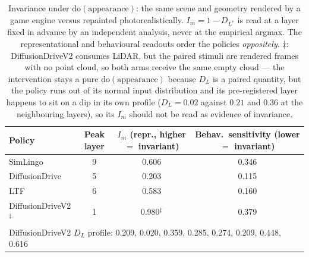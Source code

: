 \begin{table}[!tb]
\centering
\setlength{\tabcolsep}{4pt}
\footnotesize
\caption{Invariance under $\mathrm{do}(\text{appearance})$: the same scene and geometry rendered by a game engine versus repainted photorealistically. $I_m=1-D_{L^\ast}$ is read at a layer fixed in advance by an independent analysis, never at the empirical argmax. The representational and behavioural readouts order the policies \emph{oppositely}. $\ddagger$: DiffusionDriveV2 consumes LiDAR, but the paired stimuli are rendered frames with no point cloud, so both arms receive the same empty cloud --- the intervention stays a pure $\mathrm{do}(\text{appearance})$ because $D_L$ is a paired quantity, but the policy runs out of its normal input distribution and its pre-registered layer happens to sit on a dip in its own profile ($D_L=0.02$ against $0.21$ and $0.36$ at the neighbouring layers), so its $I_m$ should not be read as evidence of invariance.}
\label{tab:iaxis}
\begin{tabular}{lccc}
\toprule
Policy & Peak layer & $I_m$ (repr., higher $=$ invariant) & Behav.\ sensitivity (lower $=$ invariant)\\
\midrule
SimLingo & 9 & 0.606 & 0.346\\
DiffusionDrive & 5 & 0.203 & 0.115\\
LTF & 6 & 0.583 & 0.160\\
DiffusionDriveV2$^\ddagger$ & 1 & 0.980$^\ddagger$ & 0.379\\
\midrule
\multicolumn{4}{l}{\footnotesize DiffusionDriveV2 $D_L$ profile: 0.209, 0.020, 0.359, 0.285, 0.274, 0.209, 0.448, 0.616}\\
\bottomrule
\end{tabular}
\end{table}
